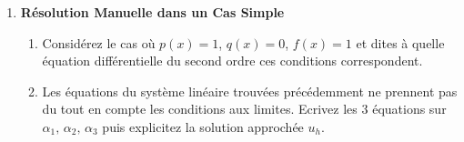 \documentclass[a4paper,12pt]{article}
\newif\ifcorriges
\newenvironment{solution}
  {
    \ifcorriges
      \begin{framed}
      \par\noindent\textbf{Corrigé :} 
  }
  {
      \end{framed}
    \fi
  }
\begin{document}
\begin{enumerate}
\begin{solution}
\begin{enumerate}
            La matrice $K$ est symétrique donc diagonalisable d'après le théorème spectral. 
        
        \item Pour le second membre du système linéaire il faut également calculer les intégrales des $\varphi_i$:
        Pour le premier élément 
        \[
        \int_{0}^{h} f(x) \varphi_0(x) dx = f_0 \int_{0}^{h} \Big(1 - \frac{x}{h}\Big) dx = f_0\Big[\frac{-h}{2}\Big(1 - \frac{x}{h}\Big)^2\Big]_{0}^{h} = \frac{f_0h}{2}
        \]
        Par symétrie, on a de même
        \[
        \int_{0}^{h} f(x) \varphi_1(x) dx = \frac{f_0h}{2}
        \]

        On peut alors assembler un second membre global pour le système linéaire.
        \[
        \mathbf{f} = \begin{pmatrix}
            f_0h/2 \\
            f_0h \\
            f_0h \\
            f_0h \\
            f_0h/2
        \end{pmatrix}
        \]
        ou alors dans un cas plus général où $f$ est constante par morceaux sur chaque élément:
        \[
        \mathbf{f} = \begin{pmatrix}
            f_0h/2 \\
            f_0h/2 + f_1h/2 \\
            f_1h/2 + f_2h/2 \\
            f_2h/2 + f_3h/2 \\
            f_3h/2
        \end{pmatrix}
        \]

        
        \end{enumerate}
        \end{solution}
        \fi
    \item \textbf{Résolution Manuelle dans un Cas Simple}
    \begin{enumerate}
        \item Considérez le cas où \( p(x) = 1 \), \( q(x) = 0 \), \( f(x) = 1 \) et dites à quelle équation différentielle du second ordre ces conditions correspondent.
        
        \item Les équations du système linéaire trouvées précédemment ne prennent pas du tout en compte les conditions aux limites. Ecrivez les $3$ équations sur $\alpha_1, \, \alpha_2, \, \alpha_3$ puis explicitez la solution approchée $u_h$. 
        

\end{enumerate}
\end{enumerate}
\end{document}
